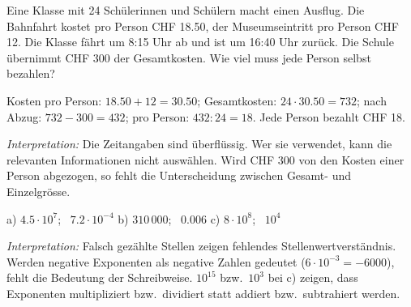\documentclass[11pt]{exam}
\newcommand{\aufgabe}[1]{%
  \needspace{8\baselineskip}%
  \renewcommand{\questionlabel}{\textbf{#1}}%
  \question}
\newcommand{\teil}[2]{\uplevel{\vspace{1ex}\textbf{\large Teil #1: #2}\par\vspace{1ex}}}
\newcommand{\geteilt}{\mathbin{:}}
\newcommand{\raum}[1]{\ifprintanswers\else\fillwithgrid{#1}\fi}
\newcommand{\diagnose}[1]{\par\smallskip\textit{Interpretation:} #1}
\begin{document}
\begin{questions}
\aufgabe{9.4}
Eine Klasse mit 24 Schülerinnen und Schülern macht einen Ausflug. Die Bahnfahrt
kostet pro Person CHF 18.50, der Museumseintritt pro Person CHF 12. Die Klasse
fährt um 8:15 Uhr ab und ist um 16:40 Uhr zurück. Die Schule übernimmt
CHF 300 der Gesamtkosten. Wie viel muss jede Person selbst bezahlen?
\begin{solution}
  Kosten pro Person: $18.50 + 12 = 30.50$; Gesamtkosten:
  $24 \cdot 30.50 = 732$; nach Abzug: $732 - 300 = 432$; pro Person:
  $432 \geteilt 24 = 18$. Jede Person bezahlt CHF 18.
  \diagnose{Die Zeitangaben sind überflüssig. Wer sie verwendet, kann die
  relevanten Informationen nicht auswählen. Wird CHF 300 von den Kosten einer
  Person abgezogen, so fehlt die Unterscheidung zwischen Gesamt- und
  Einzelgrösse.}
\end{solution}
\raum{4.5cm}

\newpage
\teil{C}{Rechnen mit Variablen}

\aufgabe{1.5}
\begin{solution}
  a) $4.5 \cdot 10^7$; \ $7.2 \cdot 10^{-4}$ \quad
  b) $310\,000$; \ $0.006$ \quad
  c) $8 \cdot 10^8$; \ $10^4$
  \diagnose{Falsch gezählte Stellen zeigen fehlendes Stellenwertverständnis.
  Werden negative Exponenten als negative Zahlen gedeutet ($6 \cdot 10^{-3}
  = -6000$), fehlt die Bedeutung der Schreibweise. $10^{15}$ bzw.\ $10^3$ bei
  c) zeigen, dass Exponenten multipliziert bzw.\ dividiert statt addiert bzw.\
  subtrahiert werden.}
\end{solution}
\raum{3.5cm}


\end{questions}
\end{document}
